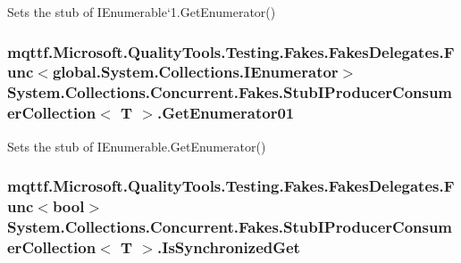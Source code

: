 Sets the stub of I\-Enumerable`1.Get\-Enumerator()

\hypertarget{class_system_1_1_collections_1_1_concurrent_1_1_fakes_1_1_stub_i_producer_consumer_collection_3_01_t_01_4_a0965d28dca798e808fef723091bf8942}{
\subsubsection[{Get\-Enumerator01}]{\setlength{\rightskip}{0pt plus 5cm}mqttf.\-Microsoft.\-Quality\-Tools.\-Testing.\-Fakes.\-Fakes\-Delegates.\-Func$<$global.\-System.\-Collections.\-I\-Enumerator$>$ System.\-Collections.\-Concurrent.\-Fakes.\-Stub\-I\-Producer\-Consumer\-Collection$<$ T $>$.Get\-Enumerator01}}\label{class_system_1_1_collections_1_1_concurrent_1_1_fakes_1_1_stub_i_producer_consumer_collection_3_01_t_01_4_a0965d28dca798e808fef723091bf8942}


Sets the stub of I\-Enumerable.\-Get\-Enumerator()

\hypertarget{class_system_1_1_collections_1_1_concurrent_1_1_fakes_1_1_stub_i_producer_consumer_collection_3_01_t_01_4_a87f0a93cc1a9ce2271f2e63e2044cff0}{
\subsubsection[{Is\-Synchronized\-Get}]{\setlength{\rightskip}{0pt plus 5cm}mqttf.\-Microsoft.\-Quality\-Tools.\-Testing.\-Fakes.\-Fakes\-Delegates.\-Func$<$bool$>$ System.\-Collections.\-Concurrent.\-Fakes.\-Stub\-I\-Producer\-Consumer\-Collection$<$ T $>$.Is\-Synchronized\-Get}}\label{class_system_1_1_collections_1_1_concurrent_1_1_fakes_1_1_stub_i_producer_consumer_collection_3_01_t_01_4_a87f0a93cc1a9ce2271f2e63e2044cff0}


